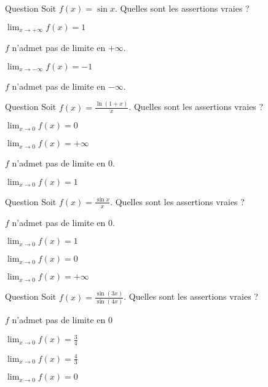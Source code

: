 \begin{multi}[multiple,feedback=
{Toute fonction périodique non constante n'admet pas de limite en l'infini.
}]{Question}
Soit \(f(x)= \sin x\). Quelles sont les assertions vraies ?

    \item \(\lim_{x\to +\infty} f(x)=1\)
    \item* \(f\) n'admet pas de limite en \(+\infty\).
    \item \(\lim_{x\to -\infty} f(x)=-1\)
    \item* \(f\) n'admet pas de limite en \(-\infty\).
\end{multi}


\begin{multi}{Question}
Soit \(f(x)= \frac{\ln(1+x)}{x}\). Quelles sont les assertions vraies ?

    \item \(\lim_{x\to 0} f(x)=0\)
    \item \(\lim_{x\to 0} f(x)=+\infty\)
    \item \(f\) n'admet pas de limite en \(0\).
    \item* \(\lim_{x\to 0} f(x)=1\)
\end{multi}


\begin{multi}[multiple,feedback=
{La fonction \(g: x\to \sin x\) est dérivable sur \(\Rr\)  et \(g'(x)= \cos x\), pour tout \(x\in \Rr\). Donc  \(\lim_{x\to 0}f(x)= \lim_{x\to 0}\frac{g(x)-g(0)}{x-0} = g'(0)=1\).
}]{Question}
Soit \(f(x)= \frac{\sin x}{x}\). Quelles sont les assertions vraies ?

    \item \(f\) n'admet pas de limite en \(0\).
    \item* \(\lim_{x\to 0} f(x)=1\)
    \item \(\lim_{x\to 0} f(x)=0\)
    \item \(\lim_{x\to 0} f(x)=+\infty\)
\end{multi}


\begin{multi}[multiple,feedback=
{\(\lim_{x\to 0}\frac{\sin x}{x} = 1,\) donc \(\lim_{x\to 0} f(x)= \lim_{x\to 0}\frac{3x}{4x} \cdot  \frac{\sin (3x)}{3x}\cdot  \frac{4x}{\sin(4x)} = \frac{3}{4}\).
}]{Question}
Soit \(f(x)= \frac{\sin(3x)}{\sin(4x)}\). Quelles sont les assertions vraies ?

    \item \(f\) n'admet pas de limite en \(0\)
    \item* \(\lim_{x\to 0} f(x)=\frac{3}{4}\)
    \item \(\lim_{x\to 0} f(x)= \frac{4}{3}\)
    \item \(\lim_{x\to 0} f(x)=0\)
\end{multi}



